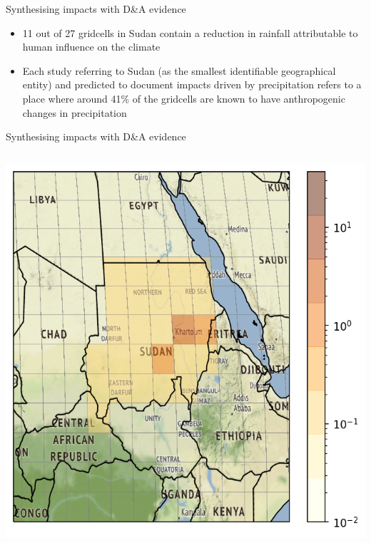 \documentclass[9pt]{beamer}
\begin{document}
\begin{frame}{Synthesising impacts with D\&A evidence}
\begin{itemize}
	\item 11 out of 27 gridcells in Sudan contain a reduction in rainfall attributable to human influence on the climate
	\item Each study referring to Sudan (as the smallest identifiable geographical entity)  and predicted to document impacts driven by precipitation refers to a place where around 41\% of the gridcells are known to have anthropogenic changes in precipitation
\end{itemize}
\end{frame}

\begin{frame}{Synthesising impacts with D\&A evidence}
\begin{columns}
\begin{column}{0.4\linewidth}
	\includegraphics[width=\linewidth]{../plots/maps/sudan_precipitation_studies.png}
\end{column}


\end{columns}
\end{frame}
\end{document}
